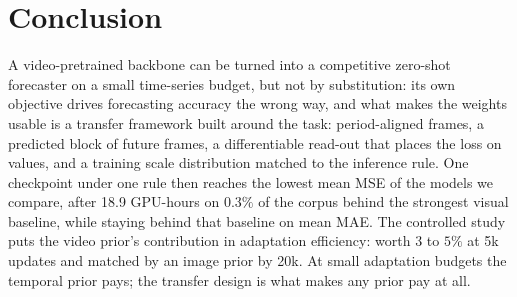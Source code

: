 \section{Conclusion}
\label{sec:conclusion}

A video-pretrained backbone can be turned into a competitive zero-shot forecaster on a small
time-series budget, but not by substitution: its own objective drives forecasting accuracy the wrong
way, and what makes the weights usable is a transfer framework built around the task: period-aligned
frames, a predicted block of future frames, a differentiable read-out that places the loss on values,
and a training scale distribution matched to the inference rule. One checkpoint under one rule then
reaches the lowest mean MSE of the models we compare, after 18.9 GPU-hours on $0.3\%$ of the corpus
behind the strongest visual baseline, while staying behind that baseline on mean MAE. The controlled
study puts the video prior's contribution in adaptation efficiency: worth $3$ to $5\%$ at 5k updates and
matched by an image prior by 20k. At small adaptation budgets the temporal prior pays; the transfer
design is what makes any prior pay at all.
